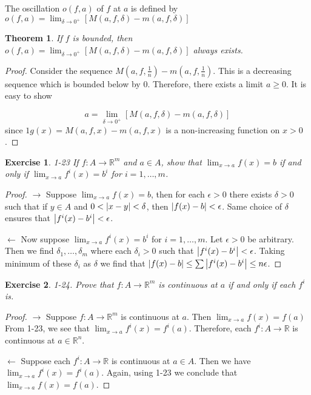 \documentclass[12pt]{book}
\newcommand\T{\rule{0pt}{2.6ex}}
\newcommand\B{\rule[-1.2ex]{0pt}{0pt}}
\newtheorem{theorem}{Theorem}
\newtheorem*{exercise*}{Exercise}
\begin{document}
The oscillation $o(f,a)$ of $f$ at $a$ is defined by $o(f,a) = \displaystyle\lim_{\delta \to 0^+} [M(a,f,\delta) - m(a,f,\delta)]$

\begin{theorem}
  If $f$ is bounded, then $o(f,a) = \displaystyle\lim_{\delta \to 0^+} [M(a,f,\delta) - m(a,f,\delta)]$ always exists. 
\end{theorem}

\begin{proof}
  Consider the sequence $M(a,f,\frac{1}{n}) - m(a,f,\frac{1}{n})$. This is a decreasing sequence which is bounded below by $0$. Therefore, there exists a limit $a \ge 0$. It is easy to show

  \[
  a = \lim_{\delta \to 0^+} [M(a,f,\delta) - m(a,f,\delta)]
  \]
  since $1g(x) = M(a,f,x) - m(a,f,x)$ is a non-increasing function on $x > 0$. 
\end{proof}

\begin{exercise*}
  1-23 If $f : A \to \mathbb{R}^m$ and $a \in A$, show that $\lim_{x \to a} f(x) = b$ if and only if $\lim_{x \to a} f^i(x)= b^i$ for $i = 1,\ldots, m$. 
\end{exercise*}

\begin{proof}
  \T\B $\rightarrow$ Suppose $\lim_{x \to a} f(x) = b$, then for each $\epsilon > 0$ there exists $\delta > 0$ such that if $y \in A$ and $0 < \abs{x-y} < \delta $, then $\abs{f(x) -b } < \epsilon$. Same choice of $\delta $ ensures that $\abs{f^i(x) -b^i} < \epsilon$. 


  \T\B $\leftarrow$ Now suppose $\lim_{x \to a} f^i(x)= b^i$ for $i = 1,\ldots, m$. Let $\epsilon > 0$ be arbitrary. Then we find $\delta_1, \ldots, \delta_m$ where each $\delta_i > 0$ such that $ \abs{f^i(x) -b^i} < \epsilon$. Taking minimum of these $\delta_i$ as $\delta$ we find that $\abs{f(x) -b } \le \sum \abs{f^i(x) -b^i} \le n\epsilon$. 
\end{proof}

\begin{exercise*}
  1-24. Prove that $f: A \to \mathbb{R}^m$ is continuous at $a$ if and only if each $f^i$ is. 
\end{exercise*}

\begin{proof}
  \T\B $\rightarrow$  Suppose $f : A \to \mathbb{R}^m$ is continuous at $a$. Then $\lim_{x \to a}f(x) = f(a)$ From 1-23, we see that $\lim_{x \to a}f^i(x) = f^i(a)$.  Therefore, each $f^i: A \to \mathbb{R}$ is continuous at $a \in \mathbb{R}^n$.

  \T\B $\leftarrow$ Suppose each $f^i: A \to \mathbb{R}$ is continuous at $a \in A$. Then we have $\lim_{x \to a}f^i(x) = f^i(a)$. Again, using 1-23 we conclude that $\lim_{x \to a}f(x) = f(a)$. 
\end{proof}
\end{document}

